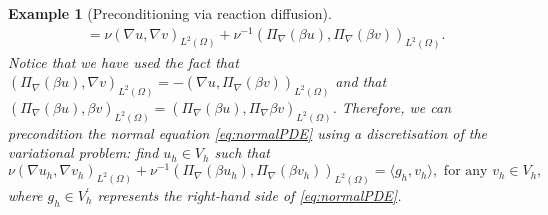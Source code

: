 \documentclass[hidelinks,onefignum,onetabnum]{siamart220329}
\newtheorem{example}{Example}
\begin{document}
\begin{example}[Preconditioning via reaction diffusion]
\begin{align}
                                               & = \nu ( \nabla u, \nabla v)_{L^2(\Omega)} + \nu^{-1}(\Pi_{\nabla}(\beta u),\Pi_{\nabla}(\beta v))_{L^2(\Omega)}.
    \end{align}
    Notice that we have used the fact that $(\Pi_{\nabla}(\beta u),\nabla v)_{L^2(\Omega)} = -(\nabla u,\Pi_{\nabla}(\beta v))_{L^2(\Omega)}$ and that $(\Pi_{\nabla}(\beta u),\beta v)_{L^2(\Omega)} = (\Pi_{\nabla}(\beta u),\Pi_{\nabla}\beta v)_{L^2(\Omega)}$.
    Therefore, we can precondition the normal equation \eqref{eq:normalPDE} using a discretisation of the variational problem: find $u_h\in V_h$ such that
    \begin{equation}
        \label{eq:discreteReactionDiffusion}
        \nu ( \nabla u_h, \nabla v_h)_{L^2(\Omega)} + \nu^{-1}(\Pi_{\nabla}(\beta u_h),\Pi_{\nabla}(\beta v_h))_{L^2(\Omega)} = \langle g_h,v_h \rangle, \text{ for any } v_h\in V_h,
    \end{equation}
    where $g_h\in V_h^\prime$ represents the right-hand side of \eqref{eq:normalPDE}.


\end{example}
\end{document}
